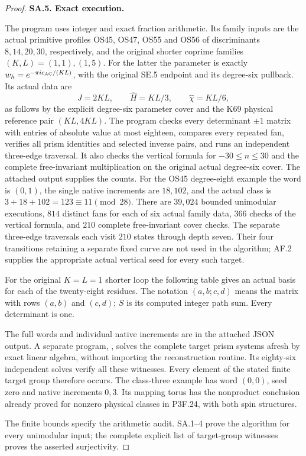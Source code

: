 \begin{proof}
\par\medskip\noindent\textbf{SA.5. Exact execution.}\par\nopagebreak[4]
The program  uses
integer and exact fraction arithmetic. Its family inputs are
the actual primitive profiles OS45, OS47, OS55 and OS56 of
discriminants \(8,14,20,30\), respectively, and the
original shorter coprime families \((K,L)=(1,1),(1,5)\).
For the latter the parameter is exactly
\(w_h=e^{-\pi i c_{\rm AC}/(KL)}\), with the original SE.5
endpoint and its degree-six pullback. Its actual data are
\[
 J=2KL,\qquad\widehat H=KL/3,\qquad\widehat\chi=KL/6,
\]
as follows by the explicit degree-six parameter cover and
the K69 physical reference pair \((KL,4KL)\).
The program checks every determinant \(\pm1\) matrix with
entries of absolute value at most eighteen, compares every
repeated fan, verifies all prism identities and selected inverse
pairs, and runs an independent three-edge traversal. It also
checks the vertical formula for \(-30\le n\le30\) and the
complete free-invariant multiplication on the original actual
degree-six cover. The attached output supplies the counts.
For the OS45 degree-eight example the word is \((0,1)\),
the single native increments are \(18,102\), and the actual
class is \(3+18+102=123\equiv11\pmod{28}\).
There are \(39{,}024\) bounded unimodular executions, \(814\)
distinct fans for each of six actual family data, \(366\) checks
of the vertical formula, and \(210\) complete free-invariant
cover checks. The separate three-edge traversals each visit
\(210\) states through depth seven. Their four transitions
retaining a separate fixed curve are not used in the algorithm;
AF.2 supplies the appropriate actual vertical seed for every
such target.

For the original \(K=L=1\) shorter loop the following table
gives an actual basis for each of the twenty-eight residues.
The notation \((a,b;c,d)\) means the matrix with rows
\((a,b)\) and \((c,d)\); \(S\) is its computed integer path
sum. Every determinant is one.

The full words and individual native increments are in the
attached JSON output. A separate program,
, solves the
complete target prism systems afresh by exact linear algebra,
without importing the reconstruction routine. Its eighty-six
independent solves verify all these witnesses. Every element
of the stated finite target group therefore occurs. The
class-three example has word \((0,0)\), seed zero and native
increments \(0,3\). Its mapping torus has the nonproduct
conclusion already proved for nonzero physical classes in
P3F.24, with both spin structures.

The finite bounds specify the arithmetic audit. SA.1--4 prove
the algorithm for every unimodular input; the complete explicit
list of target-group witnesses proves the asserted surjectivity.
\end{proof}
